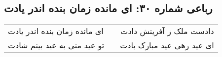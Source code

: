 \begin{center}
\section*{رباعی شماره ۳۰: ای مانده زمان بنده اندر یادت}
\label{sec:sh030}
\begin{longtable}{l p{0.5cm} r}
ای مانده زمان بنده اندر یادت
&&
دادست ملک ز آفرینش دادت
\\
تو عید منی به عید بینم شادت
&&
ای عید رهی عید مبارک بادت
\\
\end{longtable}
\end{center}
